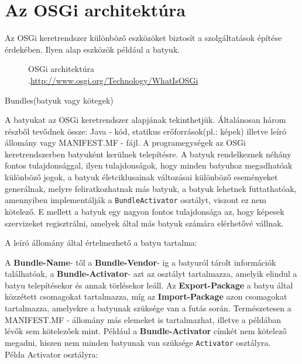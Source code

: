\section{Az OSGi architektúra}\label{sec:OSGI_architektura}

Az OSGi keretrendszer különböző eszközöket biztosít a szolgáltatások építése érdekében. Ilyen alap eszközök például a batyuk\cite{batyu}.

\begin{figure}[t]
  \centering
  \caption[OSGi architektura]%
  {OSGi architektúra\\
  {\white .}\hfill\url{http://www.osgi.org/Technology/WhatIsOSGi}}
  \label{fig:osgiArchitektura}
\end{figure}

Bundles(batyuk vagy kötegek)

A batyukat az OSGi keretrendszer alapjának tekinthetjük. Általánosan három részből tevődnek össze: Java - kód, statikus erőforrások(pl.: képek) illetve leíró állomány vagy MANIFEST.MF - fájl. A programegységek az OSGi keretrendszerben batyuként kerülnek telepítésre. A batyuk rendelkeznek néhány fontos tulajdonsággal, ilyen tulajdonságok, hogy minden batyuhoz megadhatóak különböző jogok, a batyuk életciklusainak változásai különböző eseményeket generálnak, melyre feliratkozhatnak más batyuk, a batyuk lehetnek futtathatóak, amennyiben implementálják a \texttt{BundleActivator} osztályt, viszont ez nem kötelező. E mellett a batyuk egy nagyon fontos tulajdonsága az, hogy képesek szervizeket regisztrálni, amelyek által más batyuk számára elérhetővé vállnak.

A leíró állomány által értelmezhető a batyu tartalma:

 
A \textbf{Bundle-Name}- től a \textbf{Bundle-Vendor}- ig a batyuról tárolt információk találhatóak, a \textbf{Bundle-Activator}- azt az osztályt tartalmazza, amelyik elindul a batyu telepítésekor és annak törlésekor leáll. Az \textbf{Export-Package} a batyu által közzétett csomagokat tartalmazza, míg az \textbf{Import-Package} azon csomagokat tartalmazza, amelyekre a batyunak szüksége van a futás során. Természetesen a MANIFEST.MF - állomány más elemeket is tartalmazhat, illetve a példában lévők sem kötelezőek mint. Például a \textbf{Bundle-Activator} címkét nem kötelező megadni, hiszen nem minden batyunak van szüksége \texttt{Activator} osztályra. \\Példa Activator osztályra:
\
\lstset{language=Java}


